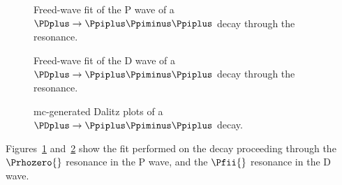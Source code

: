     \begin{figure}
        \centering
        \subfloat[][]{}

        \subfloat[][]{}

        \caption{Freed-wave fit of the P wave of a $\PDplus \to \Ppiplus\Ppiminus\Ppiplus$ decay through the \Prhozero{} resonance.~\Square}
        \label{fig:rho0_f2:p_wave}
    \end{figure}
    \begin{figure}
        \centering
        \subfloat[][]{}

        \subfloat[][]{}

        \caption{Freed-wave fit of the D wave of a $\PDplus \to \Ppiplus\Ppiminus\Ppiplus$ decay through the \Pfii{} resonance.~\Square}
        \label{fig:rho0_f2:d_wave}
    \end{figure}
    \begin{figure}
        \centering

        \caption{\ac{mc}-generated Dalitz plots of a $\PDplus \to \Ppiplus\Ppiminus\Ppiplus$ decay.~\Square}
        \label{fig:rho0_f2_dalitz}
    \end{figure}
    Figures~\ref{fig:rho0_f2:p_wave} and~\ref{fig:rho0_f2:d_wave} show the fit performed on the decay proceeding through the $\Prhozero{}$ resonance in the P wave, and the $\Pfii{}$ resonance in the D wave.

